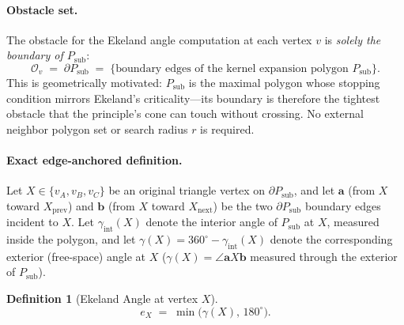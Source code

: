 \documentclass[10pt]{article}
\theoremstyle{plain}
\theoremstyle{definition}
\newtheorem{definition}[theorem]{Definition}
\begin{document}
\paragraph{Obstacle set.}
The obstacle for the Ekeland angle computation at each vertex $v$ is
\emph{solely the boundary of $P_{\mathrm{sub}}$}:
\begin{equation}
  \mathcal{O}_v \;=\; \partial P_{\mathrm{sub}}
  \;=\; \{\text{boundary edges of the kernel expansion polygon } P_{\mathrm{sub}}\}.
  \label{eq:obstacle}
\end{equation}
This is geometrically motivated: $P_{\mathrm{sub}}$ is the maximal polygon
whose stopping condition mirrors Ekeland's criticality---its boundary is
therefore the tightest obstacle that the principle's cone can touch without
crossing.
No external neighbor polygon set or search radius $r$ is required.

\paragraph{Exact edge-anchored definition.}
Let $X \in \{v_A,v_B,v_C\}$ be an original triangle vertex on $\partial P_{\mathrm{sub}}$,
and let $\mathbf{a}$ (from $X$ toward $X_{\mathrm{prev}}$) and
$\mathbf{b}$ (from $X$ toward $X_{\mathrm{next}}$) be the two $\partial P_{\mathrm{sub}}$
boundary edges incident to $X$.
Let $\gamma_{\mathrm{int}}(X)$ denote the interior angle of $P_{\mathrm{sub}}$
at $X$, measured inside the polygon, and let
$\gamma(X) = 360^\circ - \gamma_{\mathrm{int}}(X)$ denote the corresponding
exterior (free-space) angle at $X$
($\gamma(X) = \angle\mathbf{a}X\mathbf{b}$ measured through the exterior of
$P_{\mathrm{sub}}$).

\begin{definition}[Ekeland Angle at vertex $X$]
\label{def:ekeland_angle}
\begin{equation}
  e_X \;=\; \min\bigl(\gamma(X),\,180^\circ\bigr).
  \label{eq:ekeland_angle}
\end{equation}
\end{definition}
\end{document}
